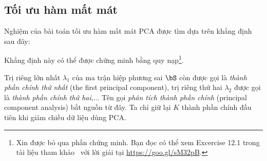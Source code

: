 \subsection{Tối ưu hàm mất mát}
Nghiệm của bài toán tối ưu hàm mất mát PCA được tìm dựa trên khẳng định sau
đây:

 
Khẳng định này có thể được chứng minh bằng quy nạp\footnote{Xin được bỏ qua
phần chứng minh. Bạn đọc có thể xem Excercise 12.1 trong tài liệu tham
khảo~\cite{bishop2006pattern} với lời giải tại \url{https://goo.gl/sM32pB}.}.

Trị riêng lớn nhất $\lambda_1$ của ma trận hiệp phương sai $\bS$ còn được gọi
là \textit{thành
phần chính thứ nhất} ({the first principal component}), trị riêng thứ hai
$\lambda_2$ được gọi là \textit{thành phần chính thứ hai},... Tên gọi
\textit{phân tích thành phần chính} ({principal component analysis}) bắt
nguồn từ đây. Ta chỉ giữ lại $K$ thành phần chính đầu tiên khi giảm chiều dữ
liệu dùng PCA. 

